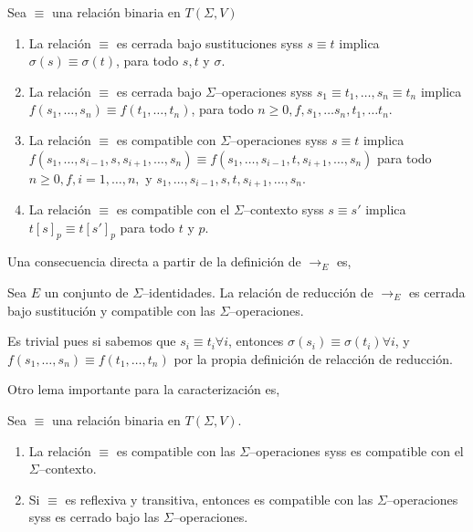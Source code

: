 \begin{defi} 
  Sea $\equiv$ una relación binaria en $T(\Sigma,V)$
  \begin{enumerate}
  \item La relación $\equiv$ es cerrada bajo sustituciones syss $s \equiv t$
    implica $\sigma(s) \equiv \sigma(t)$, para todo $s,t$ y $\sigma$. 
  \item La relación $\equiv$ es cerrada bajo $\Sigma$--operaciones syss $s_1
    \equiv t_1, \dots, s_n \equiv t_n$ implica $f(s_1, \dots, s_n) \equiv
    f(t_1, \dots, t_n)$, para todo $n \geq 0, f, s_1, \dots s_n, t_1, \dots
    t_n.$ 
  \item La relación $\equiv$ es compatible con $\Sigma$--operaciones syss $ s
    \equiv t$ implica $f(s_1, \dots, s_{i-1},s, s_{i+1},\dots, s_n) \equiv
    f(s_1, \dots, s_{i-1},t, s_{i+1},\dots, s_n)$ para todo $n \geq 0, f, i =
    1, \dots, n,$ y $s_1, \dots, s_{i-1},s,t, s_{i+1},\dots, s_n$. 
  \item La relación $\equiv$ es compatible con el $\Sigma$--contexto syss $s
    \equiv s'$ implica $t[s]_p \equiv t[s']_p$ para todo $t$ y $p$. 
  \end{enumerate}       
\end{defi}

Una consecuencia directa a partir de la definición de $\rightarrow_E$ es,

\begin{lema} \label{lema:2.1}
  Sea $E$ un conjunto de $\Sigma$--identidades. La relación de reducción de
  $\rightarrow_E$ es cerrada bajo sustitución y compatible con las
  $\Sigma$--operaciones.
\end{lema}

\begin{demo}
  Es trivial pues si sabemos que $s_i \equiv t_i \forall i$, entonces
  $\sigma(s_i) \equiv \sigma(t_i) \forall i$, y
  $f(s_1, \dots, s_n) \equiv f(t_1, \dots, t_n)$ por la propia
  definición de relacción de reducción.
\end{demo}

Otro lema importante para la caracterización es,

\begin{lema} \label{lema:2.2}
  Sea $\equiv$ una relación binaria en $T(\Sigma,V)$.
  \begin{enumerate}
  \item La relación $\equiv$ es compatible con las
    $\Sigma$--operaciones syss es compatible con el
    $\Sigma$--contexto.
  \item Si $\equiv$ es reflexiva y transitiva, entonces es compatible
    con las $\Sigma$--operaciones syss es cerrado bajo las
    $\Sigma$--operaciones.
  \end{enumerate}
\end{lema}

